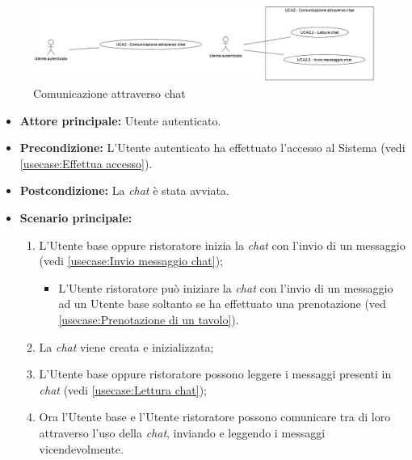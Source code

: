 \label{usecase:Comunicazione attraverso chat}

\begin{figure}[h]
	\centering
	\includegraphics[width=0.999\textwidth]{./uml/UCA2.png} 
	\caption{Comunicazione attraverso chat}
	\label{fig:UCA2}
  \end{figure}

\begin{itemize}
	\item \textbf{Attore principale:} Utente autenticato.

	\item \textbf{Precondizione:} L'Utente autenticato ha effettuato l'accesso al Sistema (vedi \autoref{usecase:Effettua accesso}).

	\item \textbf{Postcondizione:} La \textit{chat} è stata avviata.

	\item \textbf{Scenario principale:}
	      \begin{enumerate}
		      \item L'Utente base oppure ristoratore inizia la \textit{chat} con l'invio di un messaggio (vedi \autoref{usecase:Invio messaggio chat});
		            \begin{itemize}
			            \item L'Utente ristoratore può iniziare la \textit{chat} con l'invio di un messaggio ad un Utente base soltanto se ha effettuato una prenotazione (ved \autoref{usecase:Prenotazione di un tavolo}).
		            \end{itemize}
		      \item La \textit{chat} viene creata e inizializzata;
		      \item L'Utente base oppure ristoratore possono leggere i messaggi presenti in \textit{chat} (vedi \autoref{usecase:Lettura chat});
		      \item Ora l'Utente base e l'Utente ristoratore possono comunicare tra di loro attraverso l'uso della \textit{chat}, inviando e leggendo i messaggi vicendevolmente.
	      \end{enumerate}
\end{itemize}

